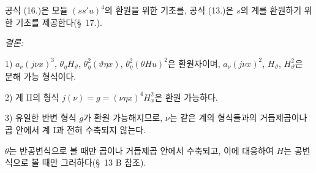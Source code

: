 
공식 (16.)은 모듈 $(ss'u)^4$의 환원을 위한 기초를, 공식 (13.)은 $s$의 계를 환원하기 위한 기초를 제공한다(\S\ 17.).

\noindent\emph{결론:}

1) $a_\nu(j\nu x)^3$, $\theta_\eta H_\vartheta$, $\theta_\eta^2(\vartheta\eta x)$, $\theta_\eta^2(\theta Hu)^2$은 환원자이며, $a_\nu(j\nu x)^2$, $H_\vartheta$, $H_\vartheta^2$은 분해 가능 형식이다.

2) 계 II의 형식 $j(\nu)=g=(\nu\eta x)^4H_x^2$은 환원 가능하다.

3) 유일한 반변 형식 $g$가 환원 가능해지므로, $\nu$는 같은 계의 형식들과의 거듭제곱이나 곱 안에서 계 I과 전혀 수축되지 않는다.

$\theta$는 반공변식으로 볼 때만 곱이나 거듭제곱 안에서 수축되고, 이에 대응하여 $H$는 공변식으로 볼 때만 그러하다(\S\ 13 B 참조).
